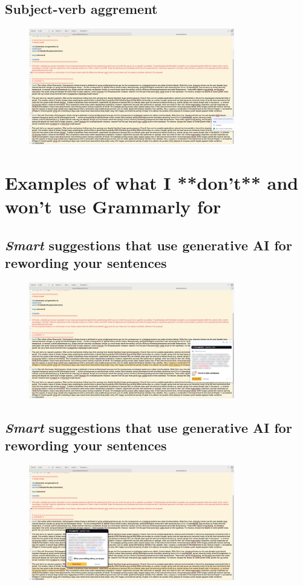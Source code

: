 \documentclass[12pt]{article}
\begin{document}
\subsection{Subject-verb aggrement}
\begin{figure}[h!] 
    \centering
    \includegraphics[width=0.8\textwidth]{subjectverbaggrement.png} 
\end{figure}
\newpage
\section{Examples of what I **don't** and won't use Grammarly for}

\subsection{\textit{Smart} suggestions that use generative AI for rewording your sentences}
\begin{figure}[h!] 
    \centering
    \includegraphics[width=0.8\textwidth]{prosuggestion.png} 
\end{figure}
\newpage
\subsection{\textit{Smart} suggestions that use generative AI for rewording your sentences}
\begin{figure}[h!] 
    \centering
    \includegraphics[width=0.8\textwidth]{prosuggestion2.png} 
\end{figure}
\end{document}
